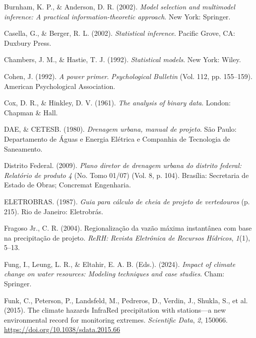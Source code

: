 \documentclass[
]{agujournal2019}
\newlength{\cslhangindent}
\newenvironment{CSLReferences}[2] %
 {\begin{list}{}{%
  \setlength{\itemindent}{0pt}
  \setlength{\leftmargin}{0pt}
  \setlength{\parsep}{0pt}
  \ifodd #1
   \setlength{\leftmargin}{\cslhangindent}
   \setlength{\itemindent}{-1\cslhangindent}
  \fi
  \setlength{\itemsep}{#2\baselineskip}}}
 {\end{list}}
\begin{document}
\begin{CSLReferences}{1}{0}
Burnham, K. P., \& Anderson, D. R. (2002). \emph{Model selection and
multimodel inference: A practical information-theoretic approach}. New
York: Springer.

Casella, G., \& Berger, R. L. (2002). \emph{Statistical inference}.
Pacific Grove, CA: Duxbury Press.

Chambers, J. M., \& Hastie, T. J. (1992). \emph{Statistical models}. New
York: Wiley.

Cohen, J. (1992). \emph{A power primer}. \emph{Psychological Bulletin}
(Vol. 112, pp. 155--159). American Psychological Association.

Cox, D. R., \& Hinkley, D. V. (1961). \emph{The analysis of binary
data}. London: Chapman \& Hall.

DAE, \& CETESB. (1980). \emph{Drenagem urbana, manual de projeto}. São
Paulo: Departamento de Águas e Energia Elétrica e Companhia de
Tecnologia de Saneamento.

Distrito Federal. (2009). \emph{Plano diretor de drenagem urbana do
distrito federal: Relatório de produto 4} (No. Tomo 01/07) (Vol. 8, p.
104). Brasília: Secretaria de Estado de Obras; Concremat Engenharia.

ELETROBRAS. (1987). \emph{Guia para cálculo de cheia de projeto de
vertedouros} (p. 215). Rio de Janeiro: Eletrobrás.

Fragoso Jr., C. R. (2004). Regionalização da vazão máxima instantânea
com base na precipitação de projeto. \emph{ReRH: Revista Eletrônica de
Recursos Hídricos}, \emph{1}(1), 5--13.

Fung, I., Leung, L. R., \& Eltahir, E. A. B. (Eds.). (2024).
\emph{Impact of climate change on water resources: Modeling techniques
and case studies}. Cham: Springer.

Funk, C., Peterson, P., Landsfeld, M., Pedreros, D., Verdin, J., Shukla,
S., et al. (2015). The climate hazards InfraRed precipitation with
stations---a new environmental record for monitoring extremes.
\emph{Scientific Data}, \emph{2}, 150066.
\url{https://doi.org/10.1038/sdata.2015.66}


\end{CSLReferences}
\end{document}
